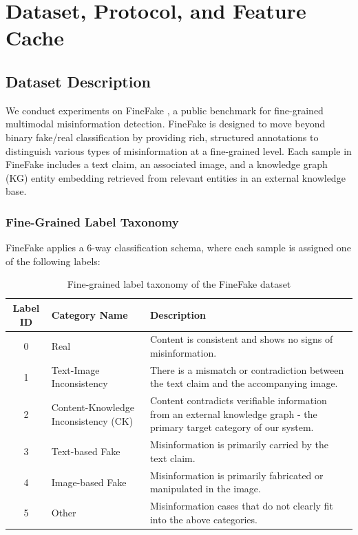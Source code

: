 \section{Dataset, Protocol, and Feature Cache}

\subsection{Dataset Description}
We conduct experiments on FineFake \cite{ref38}, a public benchmark for fine-grained multimodal misinformation detection. FineFake is designed to move beyond binary fake/real classification by providing rich, structured annotations to distinguish various types of misinformation at a fine-grained level. Each sample in FineFake includes a text claim, an associated image, and a knowledge graph (KG) entity embedding retrieved from relevant entities in an external knowledge base.

\subsubsection{Fine-Grained Label Taxonomy}
FineFake applies a 6-way classification schema, where each sample is assigned one of the following labels:

\begin{table}[!t]
\centering
\caption{Fine-grained label taxonomy of the FineFake dataset}
\begin{tabularx}{\textwidth}{|c|X|X|}
\hline
\textbf{Label ID} & \textbf{Category Name} & \textbf{Description} \\
\hline
0 & Real & Content is consistent and shows no signs of misinformation. \\
\hline
1 & Text-Image Inconsistency & There is a mismatch or contradiction between the text claim and the accompanying image. \\
\hline
2 & Content-Knowledge Inconsistency (CK) & Content contradicts verifiable information from an external knowledge graph - the primary target category of our system. \\
\hline
3 & Text-based Fake & Misinformation is primarily carried by the text claim. \\
\hline
4 & Image-based Fake & Misinformation is primarily fabricated or manipulated in the image. \\
\hline
5 & Other & Misinformation cases that do not clearly fit into the above categories. \\
\hline
\end{tabularx}
\end{table}

